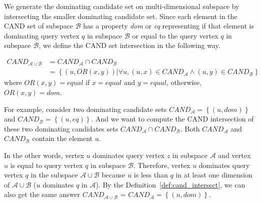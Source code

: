 We generate the dominating candidate set on multi-dimensional subspace by intersecting the smaller dominating candidate set. Since each element in the CAND set of subspace $\mathcal{B}$ has a property \emph{dom} or \emph{eq} representing if that element is dominating query vertex $q$ in subspace $\mathcal{B}$ or equal to the query vertex $q$ in subspace $\mathcal{B}$, we define the CAND set intersection in the following way.

\begin{definition}
\label{def:cand_intersect}
\begin{equation}
\begin{split}
\mathit{CAND}_{\mathcal{A} \cup \mathcal{B}} &= \mathit{CAND}_\mathcal{A} \cap \mathit{CAND}_\mathcal{B}\\
           &= \left\{(u, OR(x, y)) |\forall u, (u, x)\in \mathit{CAND}_\mathcal{A} \wedge (u, y)\in \mathit{CAND}_\mathcal{B} \right\}
\end{split}
\end{equation}
where $OR(x, y) = equal$ if $x = equal$ and $y = equal$, otherwise, $OR(x, y) = dom$.
\end{definition}

For example, consider two dominating candidate sets $\mathit{CAND}_\mathcal{A} = \left\{(u, dom)\right\}$ and $\mathit{CAND}_\mathcal{B} = \left\{(u, eq)\right\}$. And we want to compute the CAND intersection of these two dominating candidates sets $\mathit{CAND}_\mathcal{A} \cap \mathit{CAND}_\mathcal{B}$. 
Both $\mathit{CAND}_\mathcal{A}$ and $\mathit{CAND}_\mathcal{B}$ contain the element $u$. 

In the other words, vertex $u$ dominates query vertex $z$ in subspace $\mathcal{A}$ and vertex $u$ is equal to query vertex $q$ in subspace $\mathcal{B}$. 
Therefore, vertex $u$ dominates query vertex $q$ in the subspace $\mathcal{A} \cup \mathcal{B}$ because $u$ is less than $q$ in at least one dimension of $\mathcal{A} \cup \mathcal{B}$ ($u$ dominates $q$ in $\mathcal{A}$). By the Definition~\ref{def:cand_intersect}, we can also get the same answer $\mathit{CAND}_{\mathcal{A} \cup \mathcal{B}}$ = $\mathit{CAND}_\mathcal{A} = \left\{(u, dom)\right\}$.


